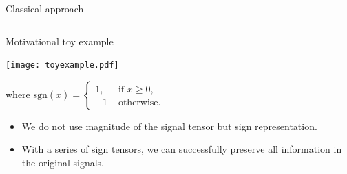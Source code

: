 \documentclass[10pt, mathserif]{beamer} %
\theoremstyle{definition}
\theoremstyle{plain}
\begin{document}
\begin{frame}{Classical approach}
\begin{itemize}
\begin{columns}
\begin{column}{0.5\textwidth}
\end{column}
\end{columns}
    
  
 \end{itemize}
\end{frame}

\begin{frame}{Motivational toy example}
    \begin{center}
    \texttt{[image: toyexample.pdf]}
    \end{center}
{\footnotesize where $\text{sgn}(x) = \begin{cases}1,&\text{ if } x\geq 0,\\-1 &\text{ otherwise.}\end{cases}$}
    \begin{itemize}
    \item We do not use magnitude of the signal tensor but {\color{red}sign representation}.
     \item With a series of sign tensors, we can successfully preserve all information in the original signals.
    \end{itemize}
\end{frame}
\end{document}
